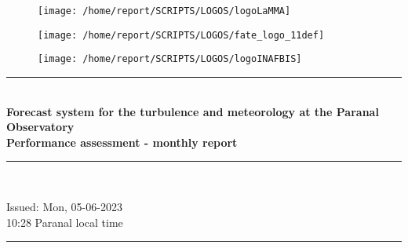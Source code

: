 \documentclass[11pt,english]{article}
\newcommand{\HRule}{\rule{\linewidth}{0.5mm}}
\begin{document}
\begin{figure}
\begin{center}
\hspace{1.5cm}
\parbox{5.5cm}{\texttt{[image: /home/report/SCRIPTS/LOGOS/logoLaMMA]}}
\hspace{.3cm}
\parbox{5.5cm}{\texttt{[image: /home/report/SCRIPTS/LOGOS/fate\_logo\_11def]}}
\hspace{.3cm}
\parbox{5.5cm}{\texttt{[image: /home/report/SCRIPTS/LOGOS/logoINAFBIS]}}
\hspace{.1cm}
\vspace{1.2cm}
\end{center}
\end{figure}

\begin{center}
\HRule \\[0.4cm]
\Huge{\textbf{Forecast system for the turbulence and meteorology at the Paranal Observatory}}
\\[0.4cm]
\LARGE{\textbf{Performance assessment - monthly report}}
\HRule \\[0.4cm]
\end{center}

\begin{center}
\vspace{2cm}\Huge{Issued: Mon, 05-06-2023\\ 10:28 Paranal local time}
\HRule \\[0.1cm]
\end{center}

\clearpage
\end{document}
